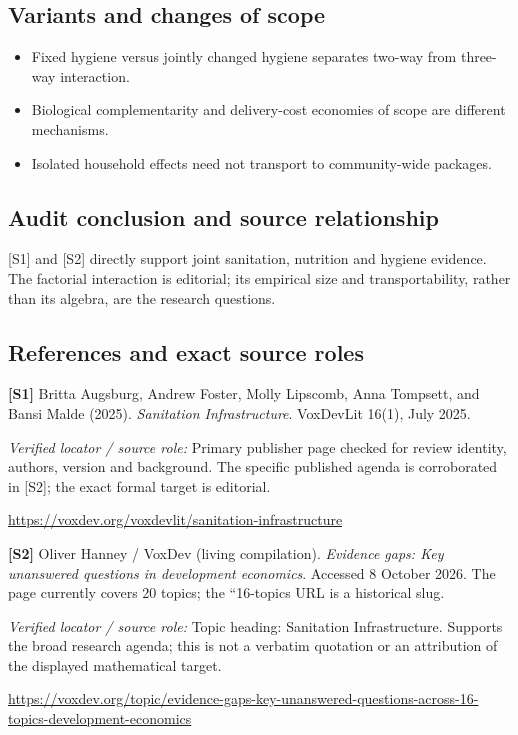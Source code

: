 \documentclass[11pt,a4paper]{article}
\begin{document}
\subsection*{Variants and changes of scope}

\begin{itemize}
\item Fixed hygiene versus jointly changed hygiene separates two-way from three-way interaction.
\item Biological complementarity and delivery-cost economies of scope are different mechanisms.
\item Isolated household effects need not transport to community-wide packages.
\end{itemize}

\subsection*{Audit conclusion and source relationship}

[S1] and [S2] directly support joint sanitation, nutrition and hygiene evidence. The factorial interaction is editorial; its empirical size and transportability, rather than its algebra, are the research questions.

\subsection*{References and exact source roles}

{\footnotesize\raggedright
\par\noindent\textbf{[S1]} Britta Augsburg, Andrew Foster, Molly Lipscomb, Anna Tompsett, and Bansi Malde (2025). \emph{Sanitation Infrastructure}. VoxDevLit 16(1), July 2025.\par \textit{Verified locator / source role:} Primary publisher page checked for review identity, authors, version and background. The specific published agenda is corroborated in [S2]; the exact formal target is editorial.\par \url{https://voxdev.org/voxdevlit/sanitation-infrastructure}\par\smallskip
\par\noindent\textbf{[S2]} Oliver Hanney / VoxDev (living compilation). \emph{Evidence gaps: Key unanswered questions in development economics}. Accessed 8 October 2026. The page currently covers 20 topics; the ``16-topics URL is a historical slug.\par \textit{Verified locator / source role:} Topic heading: Sanitation Infrastructure. Supports the broad research agenda; this is not a verbatim quotation or an attribution of the displayed mathematical target.\par \url{https://voxdev.org/topic/evidence-gaps-key-unanswered-questions-across-16-topics-development-economics}\par\smallskip
}
\end{document}
